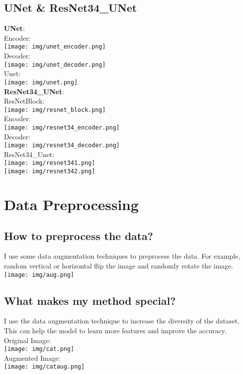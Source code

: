 \documentclass{article} %
\begin{document}
    \subsection{UNet \& ResNet34\_UNet}
    \textbf{UNet}: \\
    Encoder: \\
    \texttt{[image: img/unet\_encoder.png]} \\
    Decoder: \\
    \texttt{[image: img/unet\_decoder.png]} \\
    Unet: \\
    \texttt{[image: img/unet.png]} \\
    \textbf{ResNet34\_UNet}: \\
    ResNetBlock: \\
    \texttt{[image: img/resnet\_block.png]} \\
    Encoder: \\
    \texttt{[image: img/resnet34\_encoder.png]} \\
    Decoder: \\
    \texttt{[image: img/resnet34\_decoder.png]} \\
    ResNet34\_Unet: \\
    \texttt{[image: img/resnet341.png]} \\
    \texttt{[image: img/resnet342.png]} \\
    
    
    \section{Data Preprocessing}
    \subsection{How to preprocess the data?}
    I use some data augmentation techniques to preprocess the data. 
    For example, random vertical or horizontal flip the image and randomly rotate the image.\\
    \texttt{[image: img/aug.png]} \\
    \subsection{What makes my method special?}
    I use the data augmentation technique to increase the diversity of the dataset. 
    This can help the model to learn more features and improve the accuracy. \\
    Original Image: \\
    \texttt{[image: img/cat.png]} \\
    Augmented Image: \\
    \texttt{[image: img/cataug.png]} \\
\end{document}
